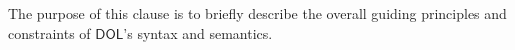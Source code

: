 \documentclass[10pt,fleqn,final]{scrreprt}
\makeatletter
\newcommand*\CommentAuthor{}
\renewcommand*\CommentAuthor{#1}}
\newcommand*\CommentDate{}
\renewcommand*\CommentDate{#1}}
\newcommand*\CommentId{}
\renewcommand*\CommentId{#1}}
\newcommand*\CommentType{}
\renewcommand*\CommentType{#1}}
\newcommand*{\SetCommentColorByType}[1]{%
\edef\localType{{#1}}%
\expandafter\ifstrequal\localType{q-aut}{\colorlet{CommentColor}{red}}{%
\expandafter\ifstrequal\localType{q-all}{\colorlet{CommentColor}{orange}}{%
\expandafter\ifstrequal\localType{todo}{\colorlet{CommentColor}{orange}}{%
\expandafter\ifstrequal\localType{fyi}{\colorlet{CommentColor}{lightgray}}{%
\colorlet{CommentColor}{yellow}}}}}}
\newcommand*{\SetCommentPrefixByType}[1]{%
\edef\localType{{#1}}%
\expandafter\@ifmtarg\localType{%
\edef\CommentPrefix{}%
}{%
\caseupper[q]{#1}%
\edef\CommentPrefix{\thestring: }%
}}
\newcommand*{\initComment}[1]{%
\setkeys{Comment}{#1}%
\SetCommentColorByType{\CommentType}%
\relax%
\SetCommentPrefixByType{\CommentType}%
\relax%
}
\newcommand*{\todonote}[2][]{%
\initComment{#1}%
\pdfcomment[author=\CommentAuthor,color=CommentColor,date=\CommentDate,id=\CommentId]{%
\CommentPrefix
#2}}
\renewcommand*{\todonote}[2][]{%
\initComment{#1}%
\ednote{\CommentPrefix #2}}
\newcommand*{\CLnote}[2][author=Christoph Lange]{%
\todonote[author=Christoph Lange,#1]{#2} 
}
\newcommand*{\shall}{\textbf{shall}\xspace}
\newcommand*{\should}{\textbf{should}\xspace}
\newcommand*{\IS}{OMG Specification\xspace}
\newcommand*{\DOL}{\ensuremath{\mathsf{DOL}}\xspace}
\makeatother
\begin{document}
%
%
%
The purpose of this clause is to briefly describe the 
 overall guiding principles and constraints of \DOL's syntax and semantics.
%
%
%
%
%
%
%
\end{document}
